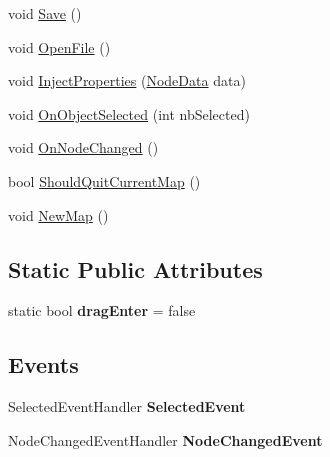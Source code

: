 \begin{DoxyCompactItemize}
\item 
void \hyperlink{class_interface_graphique_1_1_editor_controller_a8db782fb69d7ea0d739305525aaf3b7b}{Save} ()
\item 
void \hyperlink{class_interface_graphique_1_1_editor_controller_a82534a07ed6435a64360a01ce659128d}{Open\+File} ()
\item 
void \hyperlink{class_interface_graphique_1_1_editor_controller_abd34937384562cfcf70df175402cba81}{Inject\+Properties} (\hyperlink{struct_interface_graphique_1_1_node_data}{Node\+Data} data)
\item 
void \hyperlink{class_interface_graphique_1_1_editor_controller_a5544684628b8080ed829de6e3838faec}{On\+Object\+Selected} (int nb\+Selected)
\item 
void \hyperlink{class_interface_graphique_1_1_editor_controller_a59afe3cddecb779e6f5def70ee7ccaed}{On\+Node\+Changed} ()
\item 
bool \hyperlink{class_interface_graphique_1_1_editor_controller_ad98d32842dca7a2793b6b1dda99138f0}{Should\+Quit\+Current\+Map} ()
\item 
void \hyperlink{class_interface_graphique_1_1_editor_controller_ac0af486246bed86d3323d8f3ec18180e}{New\+Map} ()
\end{DoxyCompactItemize}
\subsection*{Static Public Attributes}
\begin{DoxyCompactItemize}
\item 
\hypertarget{class_interface_graphique_1_1_editor_controller_a82feebbd903c444d0b619af07f099a91}{}static bool {\bfseries drag\+Enter} = false\label{class_interface_graphique_1_1_editor_controller_a82feebbd903c444d0b619af07f099a91}

\end{DoxyCompactItemize}
\subsection*{Events}
\begin{DoxyCompactItemize}
\item 
\hypertarget{class_interface_graphique_1_1_editor_controller_aea88c2e37d91b453d2a5190c6188610b}{}Selected\+Event\+Handler {\bfseries Selected\+Event}\label{class_interface_graphique_1_1_editor_controller_aea88c2e37d91b453d2a5190c6188610b}

\item 
\hypertarget{class_interface_graphique_1_1_editor_controller_a032b24e2dbb8d2497cd5288c235c455d}{}Node\+Changed\+Event\+Handler {\bfseries Node\+Changed\+Event}\label{class_interface_graphique_1_1_editor_controller_a032b24e2dbb8d2497cd5288c235c455d}

\end{DoxyCompactItemize}


